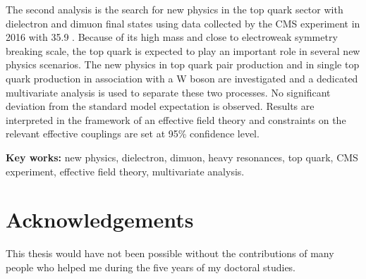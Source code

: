 
The second analysis is the search for new physics in the top quark sector with dielectron and dimuon final states using data collected by the CMS experiment in 2016 with 35.9 \fbinv. Because of its high mass and close to electroweak symmetry breaking scale, the top quark is expected to play an important role in several new physics scenarios. The new physics in top quark pair production and in single top quark production in association with a W boson are investigated and a dedicated multivariate analysis is used to separate these two processes. No significant deviation from the standard model expectation is observed. Results are interpreted in the framework of an effective field theory and constraints on the relevant effective couplings are set at 95\% confidence level.


\textbf{Key works:} new physics, dielectron, dimuon, heavy resonances, top quark, CMS experiment, effective field theory, multivariate analysis.

\afterpage{\blankpage}
\newpage
\section*{Acknowledgements}

This thesis would have not been possible without the contributions of many people who helped me during the five years of my doctoral studies.


